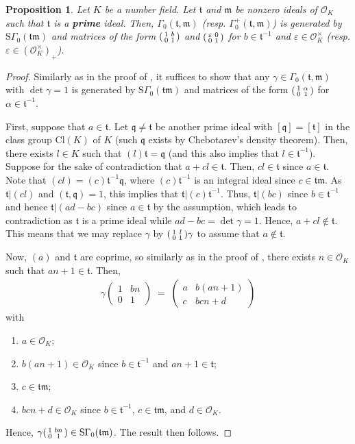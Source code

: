 \documentclass[11pt]{amsart}
\newtheorem{prop}[theorem]{Proposition}
\theoremstyle{remark}
\newcommand\m[1]{\begin{pmatrix}#1\end{pmatrix}}
\newcommand\sm[1]{\begin{psmallmatrix}#1\end{psmallmatrix}}
\newcommand\fr[1]{\mathfrak{#1}}
\newcommand{\eps}{\varepsilon}
\newcommand{\clo}{\mathcal{O}}
\newcommand{\eq}{\;=\;}
\newcommand{\Cl}{\mathrm{Cl}}
\newcommand{\SG}{\mathrm{S}\Gamma}
\begin{document}
\begin{prop}
\label{gamma0-generator}
Let $K$ be a number field. Let $\fr{t}$ and $\fr{m}$ be nonzero ideals of $\clo_K$ such that $\fr{t}$ is a \textbf{prime} ideal. Then, $\Gamma_0(\fr{t},\fr{m})$ (resp. $\Gamma_0^+(\fr{t},\fr{m})$) is generated by $\SG_0(\fr{tm})$ and matrices of the form $\sm{1&b\\0&1}$ and $\sm{\eps&0\\0&1}$ for $b\in\fr{t}^{-1}$ and $\eps\in\clo_K^\times$ (resp. $\eps\in(\clo_K^\times)_+$).
\end{prop}
\begin{proof}
Similarly as in the proof of , it suffices to show that any $\gamma\in\Gamma_0(\fr{t},\fr{m})$ with $\det\gamma=1$ is generated by $\SG_0(\fr{tm})$ and matrices of the form $\sm{1&\alpha\\0&1}$ for $\alpha\in\fr{t}^{-1}$.

First, suppose that $a\in\fr{t}$. Let $\fr{q}\neq\fr{t}$ be another prime ideal with $[\fr{q}]=[\fr{t}]$ in the class group $\Cl(K)$ of $K$ (such $\fr{q}$ exists by Chebotarev's density theorem). Then, there exists $l\in K$ such that $(l)\fr{t}=\fr{q}$ (and this also implies that $l\in\fr{t}^{-1}$). Suppose for the sake of contradiction that $a+cl\in\fr{t}$. Then, $cl\in\fr{t}$ since $a\in\fr{t}$. Note that $(cl)=(c)\fr{t}^{-1}\fr{q}$, where $(c)\fr{t}^{-1}$ is an integral ideal since $c\in\fr{tm}$. As $\fr{t}|(cl)$ and $(\fr{t},\fr{q})=1$, this implies that $\fr{t}|(c)\fr{t}^{-1}$. Thus, $\fr{t}|(bc)$ since $b\in\fr{t}^{-1}$ and hence $\fr{t}|(ad-bc)$ since $a\in\fr{t}$ by the assumption, which leads to contradiction as $\fr{t}$ is a prime ideal while $ad-bc=\det\gamma=1$. Hence, $a+cl\notin\fr{t}$. This means that we may replace $\gamma$ by $\sm{1&l\\0&1}\gamma$ to assume that $a\notin\fr{t}$.

Now, $(a)$ and $\fr{t}$ are coprime, so similarly as in the proof of , there exists $n\in\clo_K$ such that $an+1\in\fr{t}$. Then,
\begin{align*}
    \gamma\m{1&bn\\0&1}\eq\m{a&b(an+1)\\c&bcn+d}
\end{align*}
with
\begin{enumerate}[label=(\arabic*)]
    \item $a\in\clo_K$;
    \item $b(an+1)\in\clo_K$ since $b\in\fr{t}^{-1}$ and $an+1\in\fr{t}$;
    \item $c\in\fr{tm}$;
    \item $bcn+d\in\clo_K$ since $b\in\fr{t}^{-1}$, $c\in\fr{tm}$, and $d\in\clo_K$.
\end{enumerate}
Hence, $\gamma\sm{1&bn\\0&1}\in\SG_0(\fr{tm})$. The result then follows.
\end{proof}
\end{document}
